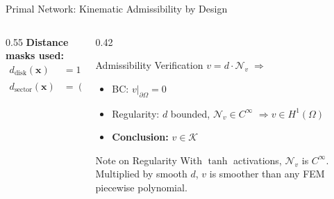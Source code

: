 \documentclass[10pt,aspectratio=169]{beamer}
\begin{document}
\begin{frame}{Primal Network: Kinematic Admissibility by Design}
\begin{columns}[T]
\begin{column}{0.55\textwidth}
      \bigskip
      \textbf{Distance masks used:}
      \begin{align*}
        d_{\text{disk}}(\mathbf{x}) &= 1 - x^2 - y^2 \\
        d_{\text{sector}}(\mathbf{x}) &= (1-r)\,\theta\,({\textstyle\frac{3\pi}{2}}-\theta)
      \end{align*}
    \end{column}
    \begin{column}{0.42\textwidth}
      \begin{block}{Admissibility Verification}
        $v = d \cdot \mathcal{N}_v \;\Rightarrow$
        \begin{itemize}
          \item BC: $v|_{\partial\Omega} = 0$ \checkmark
          \item Regularity: $d$ bounded,
                $\mathcal{N}_v \in C^\infty$
                $\Rightarrow v \in H^1(\Omega)$ \checkmark
          \item \textbf{Conclusion:} $v \in \mathcal{K}$
        \end{itemize}
      \end{block}
      \medskip
      \begin{block}{Note on Regularity}
        With $\tanh$ activations, $\mathcal{N}_v$
        is $C^\infty$. Multiplied by smooth $d$,
        $v$ is smoother than any FEM piecewise
        polynomial.
      \end{block}
    \end{column}
  \end{columns}
\end{frame}
\end{document}
